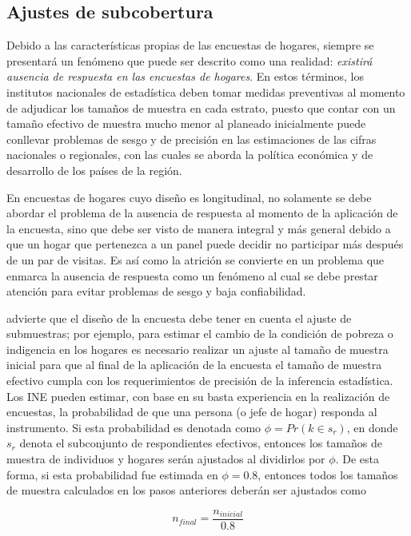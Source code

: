 \documentclass[12pt,spanish,]{book}
\begin{document}
\hypertarget{ajustes-de-subcobertura}{%
\subsection{Ajustes de subcobertura}\label{ajustes-de-subcobertura}}

Debido a las características propias de las encuestas de hogares, siempre se presentará un fenómeno que puede ser descrito como una realidad: \emph{existirá ausencia de respuesta en las encuestas de hogares}. En estos términos, los institutos nacionales de estadística deben tomar medidas preventivas al momento de adjudicar los tamaños de muestra en cada estrato, puesto que contar con un tamaño efectivo de muestra mucho menor al planeado inicialmente puede conllevar problemas de sesgo y de precisión en las estimaciones de las cifras nacionales o regionales, con las cuales se aborda la política económica y de desarrollo de los países de la región.

En encuestas de hogares cuyo diseño es longitudinal, no solamente se debe abordar el problema de la ausencia de respuesta al momento de la aplicación de la encuesta, sino que debe ser visto de manera integral y más general debido a que un hogar que pertenezca a un panel puede decidir no participar más después de un par de visitas. Es así como la atrición se convierte en un problema que enmarca la ausencia de respuesta como un fenómeno al cual se debe prestar atención para evitar problemas de sesgo y baja confiabilidad.

\textcite{Kalton_2009} advierte que el diseño de la encuesta debe tener en cuenta el ajuste de submuestras; por ejemplo, para estimar el cambio de la condición de pobreza o indigencia en los hogares es necesario realizar un ajuste al tamaño de muestra inicial para que al final de la aplicación de la encuesta el tamaño de muestra efectivo cumpla con los requerimientos de precisión de la inferencia estadística. Los INE pueden estimar, con base en su basta experiencia en la realización de encuestas, la probabilidad de que una persona (o jefe de hogar) responda al instrumento. Si esta probabilidad es denotada como \(\phi=Pr(k \in s_r)\), en donde \(s_r\) denota el subconjunto de respondientes efectivos, entonces los tamaños de muestra de individuos y hogares serán ajustados al dividirlos por \(\phi\). De esta forma, si esta probabilidad fue estimada en \(\phi = 0.8\), entonces todos los tamaños de muestra calculados en los pasos anteriores deberán ser ajustados como

\[n_{final} = \frac{n_{inicial}}{0.8}\]
\end{document}
